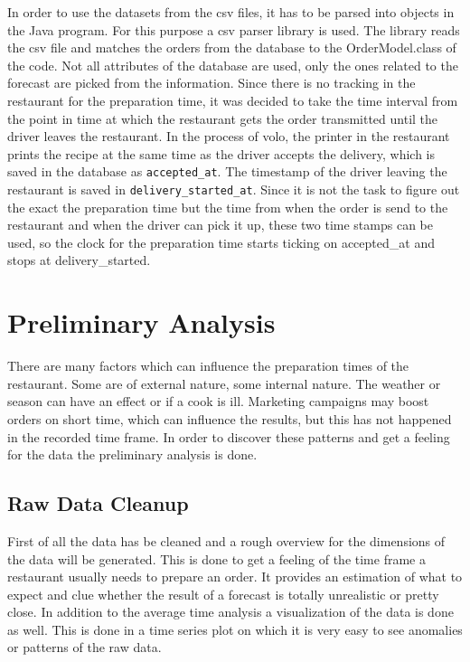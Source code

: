 In order to use the datasets from the csv files, it has to be parsed into objects in the Java program. For this purpose a csv parser library is used. The library reads the csv file and matches the orders from the database to the OrderModel.class of the code. Not all attributes of the database are used, only the ones related to the forecast are picked from the information. Since there is no tracking in the restaurant for the preparation time, it was decided to take the time interval from the point in time at which the restaurant gets the order transmitted until the driver leaves the restaurant. In the process of volo, the printer in the restaurant prints the recipe at the same time as the driver accepts the delivery, which is saved in the database as \texttt{accepted\_at}. The timestamp of the driver leaving the restaurant is saved in \texttt{delivery\_started\_at}. Since it is not the task to figure out the exact the preparation time but the time from when the order is send to the restaurant and when the driver can pick it up,  these two time stamps can be used, so the clock for the preparation time starts ticking on accepted_at and stops at delivery_started.
\section{Preliminary Analysis}\label{section:Preliminary Analysis}
There are many factors which can influence the preparation times of the restaurant. Some are of external nature, some internal nature. The weather or season can have an effect or if a cook is ill.\newline
Marketing campaigns may boost orders on short time, which can influence the results, but this has not happened in the recorded time frame.\newline
In order to discover these patterns and get a feeling for the data the preliminary analysis is done.
\subsection{Raw Data Cleanup}\label{subsection:Raw Data Cleanup}
First of all the data has be cleaned and a rough overview for the dimensions of the data will be generated. This is done to get a feeling of the time frame a restaurant usually needs to prepare an order. It provides an estimation of what to expect and clue whether the result of a forecast is totally unrealistic or pretty close. In addition to the average time analysis a visualization of the data is done as well. This is done in a time series plot on which it is very easy to see anomalies or patterns of the raw data.\newline

